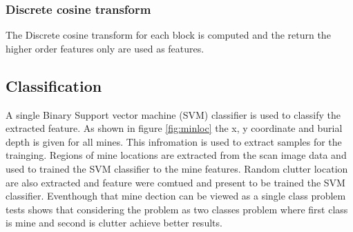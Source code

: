 \documentclass[conference]{IEEEtran}
\begin{document}
%

\subsubsection {Discrete cosine transform}
The Discrete cosine transform for each block is computed and the return the higher order features only are used as features.

\subsection {Classification}
A single Binary Support vector machine (SVM) classifier is used to classify the extracted feature.  As shown in figure \ref{fig:minloc} the x, y  coordinate and burial depth is given for all mines. This infromation is used to extract samples for the trainging. Regions of mine locations  are extracted from the scan image data and used to trained the SVM classifier to the mine features. Random clutter location are also extracted and feature were comtued and present to be trained the SVM classifier.  Eventhough that mine dection can be viewed as a single class problem tests shows that considering the problem as two classes problem where first class is mine and second is clutter  achieve better results.
\end{document}
